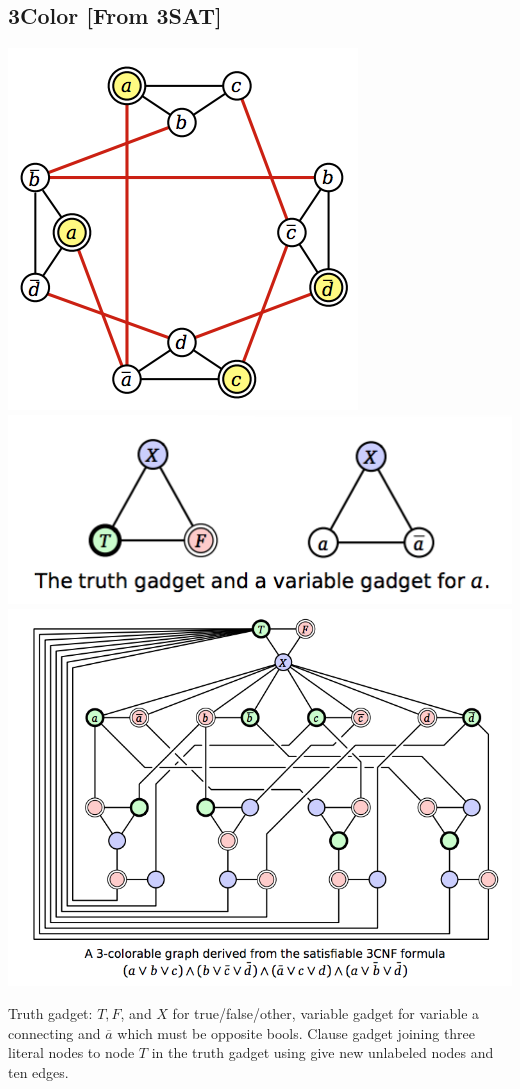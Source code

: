\subsection{3Color [From 3SAT]}
\includegraphics[width=\linewidth]{images/hamcycle.png}
\includegraphics[width=\linewidth]{images/truthgadget.png}
\includegraphics[width=\linewidth]{images/3color.png}

Truth gadget: $T,F$, and $X$ for true/false/other, variable gadget for variable a connecting and $\overbar{a}$ which must be opposite bools. Clause gadget joining three literal nodes to node $T$ in the truth gadget using give new unlabeled nodes and ten edges.